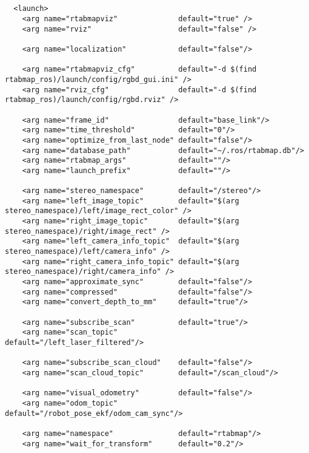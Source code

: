 \begin{center}
\begin{footnotesize}
\begin{verbatim}

  
  <launch>
    <arg name="rtabmapviz"              default="true" /> 
    <arg name="rviz"                    default="false" />
    
    <arg name="localization"            default="false"/>
    
    <arg name="rtabmapviz_cfg"          default="-d $(find rtabmap_ros)/launch/config/rgbd_gui.ini" />
    <arg name="rviz_cfg"                default="-d $(find rtabmap_ros)/launch/config/rgbd.rviz" />
    
    <arg name="frame_id"                default="base_link"/>
    <arg name="time_threshold"          default="0"/>
    <arg name="optimize_from_last_node" default="false"/>
    <arg name="database_path"           default="~/.ros/rtabmap.db"/>
    <arg name="rtabmap_args"            default=""/>
    <arg name="launch_prefix"           default=""/>
    
    <arg name="stereo_namespace"        default="/stereo"/>
    <arg name="left_image_topic"        default="$(arg stereo_namespace)/left/image_rect_color" />
    <arg name="right_image_topic"       default="$(arg stereo_namespace)/right/image_rect" />
    <arg name="left_camera_info_topic"  default="$(arg stereo_namespace)/left/camera_info" />
    <arg name="right_camera_info_topic" default="$(arg stereo_namespace)/right/camera_info" />
    <arg name="approximate_sync"        default="false"/>
    <arg name="compressed"              default="false"/>
    <arg name="convert_depth_to_mm"     default="true"/>
     
    <arg name="subscribe_scan"          default="true"/>
    <arg name="scan_topic"              default="/left_laser_filtered"/>
     
    <arg name="subscribe_scan_cloud"    default="false"/>
    <arg name="scan_cloud_topic"        default="/scan_cloud"/>
    
    <arg name="visual_odometry"         default="false"/>
    <arg name="odom_topic"              default="/robot_pose_ekf/odom_cam_sync"/> 
    
    <arg name="namespace"               default="rtabmap"/>
    <arg name="wait_for_transform"      default="0.2"/>
    

\end{verbatim}
\end{footnotesize}
\end{center}
